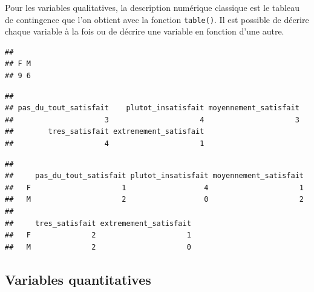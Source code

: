 \documentclass[
]{book}
\newenvironment{Shaded}{\begin{snugshade}}{\end{snugshade}}
\newcommand{\FunctionTok}[1]{\textcolor[rgb]{0.13,0.29,0.53}{\textbf{#1}}}
\newcommand{\NormalTok}[1]{#1}
\newcommand{\SpecialCharTok}[1]{\textcolor[rgb]{0.81,0.36,0.00}{\textbf{#1}}}
\begin{document}
Pour les variables qualitatives, la description numérique classique est le tableau de contingence que l'on obtient avec la fonction \texttt{table()}. Il est possible de décrire chaque variable à la fois ou de décrire une variable en fonction d'une autre.

\begin{Shaded}
\end{Shaded}

\begin{verbatim}
## 
## F M 
## 9 6
\end{verbatim}

\begin{Shaded}
\end{Shaded}

\begin{verbatim}
## 
## pas_du_tout_satisfait    plutot_insatisfait moyennement_satisfait 
##                     3                     4                     3 
##        tres_satisfait extremement_satisfait 
##                     4                     1
\end{verbatim}

\begin{Shaded}
\end{Shaded}

\begin{verbatim}
##    
##     pas_du_tout_satisfait plutot_insatisfait moyennement_satisfait
##   F                     1                  4                     1
##   M                     2                  0                     2
##    
##     tres_satisfait extremement_satisfait
##   F              2                     1
##   M              2                     0
\end{verbatim}

\subsection{Variables quantitatives}\label{variables-quantitatives}
\end{document}
